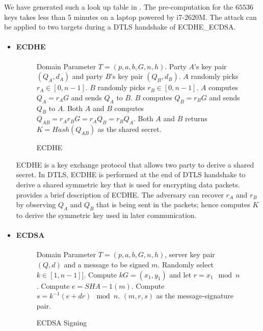 We have generated such a look up table in \cite{prngtest}. The pre-computation for the $65536$ keys takes less than 5 minutes on a laptop powered by i7-2620M. 
The attack can be applied to two targets during a DTLS handshake of ECDHE\_ECDSA.

\begin{itemize}
\item \paragraph{\textbf{ECDHE}}
	\begin{figure}
		\begin{algorithmic}[1]
		\scriptsize
		\REQUIRE Domain Parameter $T = (p, a, b, G, n, h)$. Party $A$'s key pair $(Q_A, d_A)$ and party $B$'s key pair $(Q_B, d_B)$. 
		\STATE $A$ randomly picks $r_A \in [0, n-1]$. 
		\STATE $B$ randomly picks $r_B \in [0, n-1]$.
		\STATE $A$ computes $Q_A = {r_A}G$ and sends $Q_A$ to $B$.
		\STATE $B$ computes $Q_B = {r_B}G$ and sends $Q_B$ to $A$.
		\STATE Both $A$ and $B$ computes $Q_{AB} = {r_A}{r_B}G = {r_A}{Q_B} = {r_B}{Q_A}$.
		\RETURN Both $A$ and $B$ returns $K = Hash(Q_{AB})$ as the shared secret.
		\end{algorithmic}
		\caption{ECDHE}
		\label{ECDHE}
	\end{figure}
	
	ECDHE is a key exchange protocol that allows two party to derive a shared secret. In DTLS, ECDHE is performed at the end of DTLS handshake to derive a shared symmetric key that is used for encrypting data packets.  provides a brief description of ECDHE. The adversary can recover $r_A$ and $r_B$ by observing $Q_A$ and $Q_B$ that is being sent in the packets; hence computes $K$ to derive the symmetric key used in later communication.

\item \paragraph{\textbf{ECDSA}}
	\begin{figure}
		\begin{algorithmic}[1]
		\scriptsize
		\REQUIRE Domain Parameter $T = (p, a, b, G, n, h)$, server key pair $(Q,d)$ and a message to be signed $m$.
		\STATE Randomly select $k \in [1, n-1]]$.
		\STATE Compute $kG = (x_1, y_1)$ and let $r = x_1 \mod n$.
		\STATE Compute $e = SHA-1(m)$.
		\STATE Compute $s = k^{-1}(e + dr) \mod n$.
		\RETURN $(m,r,s)$ as the message-signature pair.
		\end{algorithmic}
		\caption{ECDSA Signing}
		\label{ECDSA}
	\end{figure}
	

\end{itemize}
